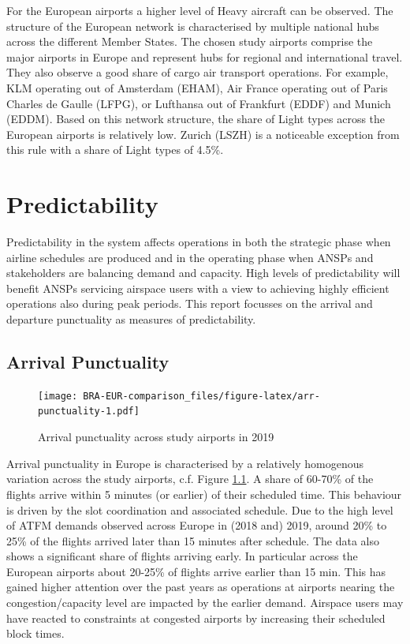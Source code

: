 \documentclass[
]{book}
\begin{document}
For the European airports a higher level of Heavy aircraft can be observed.
The structure of the European network is characterised by multiple national hubs across the different Member States.
The chosen study airports comprise the major airports in Europe and represent hubs for regional and international travel.
They also observe a good share of cargo air transport operations.
For example, KLM operating out of Amsterdam (EHAM), Air France operating out of Paris Charles de Gaulle (LFPG), or Lufthansa out of Frankfurt (EDDF) and Munich (EDDM).
Based on this network structure, the share of Light types across the European airports is relatively low.
Zurich (LSZH) is a noticeable exception from this rule with a share of Light types of 4.5\%.

\hypertarget{predictability}{%
\chapter{Predictability}\label{predictability}}

Predictability in the system affects operations in both the strategic phase when airline schedules are produced and in the operating phase when ANSPs and stakeholders are balancing demand and capacity.
High levels of predictability will benefit ANSPs servicing airspace users with a view to achieving highly efficient operations also during peak periods.
This report focusses on the arrival and departure punctuality as measures of predictability.

\hypertarget{arrival-punctuality}{%
\section{Arrival Punctuality}\label{arrival-punctuality}}



\begin{figure}
\centering
\texttt{[image: BRA-EUR-comparison\_files/figure-latex/arr-punctuality-1.pdf]}
\caption{\label{fig:arr-punctuality}Arrival punctuality across study airports in 2019}
\end{figure}

Arrival punctuality in Europe is characterised by a relatively homogenous variation across the study airports, c.f. Figure \ref{fig:arr-punctuality}.
A share of 60-70\% of the flights arrive within 5 minutes (or earlier) of their scheduled time.
This behaviour is driven by the slot coordination and associated schedule.
Due to the high level of ATFM demands observed across Europe in (2018 and) 2019, around 20\% to 25\% of the flights arrived later than 15 minutes after schedule.
The data also shows a significant share of flights arriving early.
In particular across the European airports about 20-25\% of flights arrive earlier than 15 min.
This has gained higher attention over the past years as operations at airports nearing the congestion/capacity level are impacted by the earlier demand.
Airspace users may have reacted to constraints at congested airports by increasing their scheduled block times.
\end{document}
